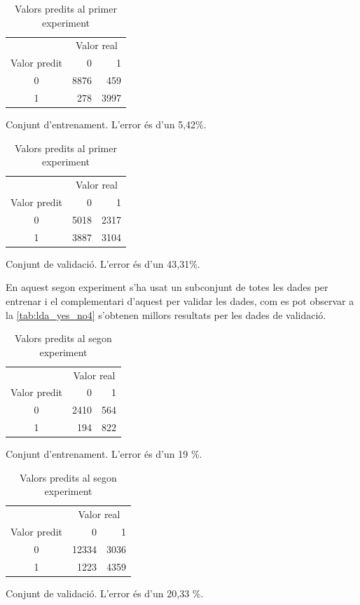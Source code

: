 \documentclass[a4paper]{article}
\begin{document}
\begin{table}[H]
	\def\arraystretch{1.3}
	\begin{subtable}[t]{0.49\textwidth}
		\centering
		\begin{tabular}{|c|rr|}
			\hline
			& \multicolumn{2}{c|}{Valor real} \\
			Valor predit & 0 & 1 \\
			\hline
			0 & 8876 & 459 \\
			1 & 278 & 3997 \\
			\hline
		\end{tabular}
		\caption{Conjunt d'entrenament. L'error és d'un 5,42\%.}
		\label{tab:lda_yes_no1}
	\end{subtable}
	\hfill
	\begin{subtable}[t]{0.49\textwidth}
		\centering
		\begin{tabular}{|c|rr|}
			\hline
			& \multicolumn{2}{c|}{Valor real} \\
			Valor predit & 0 & 1 \\
			\hline
			0 & 5018 & 2317 \\
			1 & 3887 & 3104 \\
			\hline
		\end{tabular}
		\caption{Conjunt de validació. L'error és d'un 43,31\%.}
		\label{tab:lda_yes_no2}
	\end{subtable}
	\caption{Valors predits al primer experiment}
\end{table}

En aquest segon experiment s'ha usat un subconjunt de totes les dades per entrenar i el complementari d'aquest per validar les dades, com es pot observar a la \autoref{tab:lda_yes_no4} s'obtenen millors resultats per les dades de validació.

\begin{table}[H]
	\def\arraystretch{1.3}
	\begin{subtable}[t]{0.49\textwidth}
		\centering
		\begin{tabular}{|c|rr|}
			\hline
			& \multicolumn{2}{c|}{Valor real} \\
			Valor predit & 0 & 1 \\
			\hline
			0 & 2410 & 564 \\
			1 &  194 & 822 \\
			\hline
		\end{tabular}
		\caption{Conjunt d'entrenament. L'error és d'un 19 \%.}
		\label{tab:lda_yes_no3}
	\end{subtable}
	\hfill
	\begin{subtable}[t]{0.49\textwidth}
		\centering
		\begin{tabular}{|c|rr|}
			\hline
			& \multicolumn{2}{c|}{Valor real} \\
			Valor predit & 0 & 1 \\
			\hline
			0 & 12334 & 3036 \\
			1 &  1223 & 4359 \\
			\hline
		\end{tabular}
		\caption{Conjunt de validació. L'error és d'un 20,33 \%.}
		\label{tab:lda_yes_no4}
	\end{subtable}
	\caption{Valors predits al segon experiment}
\end{table}
\end{document}
